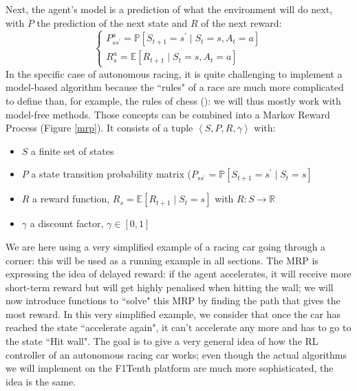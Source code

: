 Next, the agent's model is a prediction of what the environment will do next, with $P$ the prediction of the next state and $R$ of the next reward:
 \begin{equation}
 	\begin{cases}
 		P_{s s^{'}}^{a}=\mathbb{P}[S_{t+1}=s^{'} \mid S_t = s, A_t = a ] \\
 		R_{s}^{a} = \mathbb{E} [ R_{t+1} \mid S_{t} = s, A_t = a ]
 	\end{cases}
 \end{equation}
 In the specific case of autonomous racing, it is quite challenging to implement a model-based algorithm because the ``rules" of a race are much more complicated to define than, for example, the rules of chess (\cite{modelbased}): we will thus mostly work with model-free methods. \newline
 Those concepts can be combined into a Markov Reward Process (Figure \ref{mrp}). It consists of a tuple $\left< S,P,R,\gamma \right>$ with:
 \begin{itemize}
 	\item $S$ a finite set of states
 	\item $P$ a state transition probability matrix ($P_{s s^{'}} = \mathbb{P} \left[ S_{t+1} = s^{'} \mid S_t = s \right]$
 	\item $R$ a reward function, $R_s = \mathbb{E} \left[ R_{t+1} \mid S_t = s \right]$ with $R: S \rightarrow \mathbb{R}$
 	\item $\gamma$ a discount factor, $\gamma \in [0,1]$
 \end{itemize}
 
 We are here using a very simplified example of a racing car going through a corner: this will be used as a running example in all sections.
 The MRP is expressing the idea of delayed reward: if the agent accelerates, it will receive more short-term reward but will get highly penalised when hitting the wall; we will now introduce functions to ``solve" this MRP by finding the path that gives the most reward. In this very simplified example, we consider that once the car has reached the state ``accelerate again", it can't accelerate any more and has to go to the state ``Hit wall". \newline
 The goal is to give a very general idea of how the RL controller of an autonomous racing car works; even though the actual algorithms we will implement on the F1Tenth platform are much more sophisticated, the idea is the same.
 
